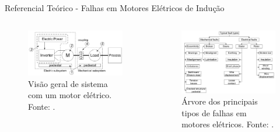 \documentclass[aspectratio=169]{beamer}
\begin{document}
\begin{frame}{Referencial Teórico - Falhas em Motores Elétricos de Indução}
	\begin{columns}
    	\begin{column}{0.50\textwidth}
			\begin{figure}[HT]
				\begin{center}
					\captionsetup{justification=justified}
					\includegraphics[scale=.25]{../referencial/img/motor_system_rilski_p2.png}
					\caption{Visão geral de sistema com um motor elétrico. \newline
					Fonte: .} 
					\label{fig:motor_system_rilski_p2}
				\end{center}
			\end{figure}
     	\end{column}
		
		\begin{column}{0.5\textwidth}
			\begin{figure}[HT]
				\begin{center}
					\captionsetup{justification=justified}
					\includegraphics[scale=.27]{../referencial/img/faults_rilski_p77.png}
					\caption{Árvore dos principais tipos de \newline
					falhas em motores elétricos. \newline
					Fonte: .} 
					\label{fig:faults_rilski_p77}
				\end{center}
			\end{figure}
	 	\end{column}
	 \end{columns}
\end{frame}
\end{document}
